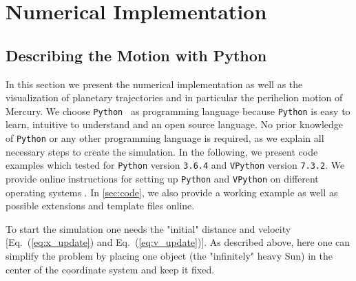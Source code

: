 \documentclass[12pt,ngerman,american]{iopart}
\newcommand{\python}[0]{\texttt{Python}}
\newcommand{\vpython}[0]{\texttt{VPython}}
\begin{document}



\section{Numerical Implementation}\label{sec:Numerical Implementation}

\subsection{Describing the Motion with Python}

In this section we present the numerical implementation as well as the visualization of planetary trajectories and in
particular the perihelion motion of Mercury.
We choose \python{}~\cite{Python} as programming language because \python{} is easy to learn, intuitive to understand and an open source language.
No prior knowledge of \python{} or any other programming language is required, as we explain all necessary steps to create the simulation.
In the following, we present code examples which tested for \python{} version \texttt{3.6.4} and \vpython{} version \texttt{7.3.2}.
We provide online instructions for setting up \python{} and \vpython{} on different operating systems \cite{scripts}.
In \ref{sec:code}, we also provide a working example as well as possible extensions and template files online.

To start the simulation one needs the "initial" distance and velocity [Eq.~(\ref{eq:x_update}) and Eq.~(\ref{eq:v_update})].
As described above, here one can simplify the problem by placing one object (the "infinitely" heavy Sun) in the center of the coordinate system and keep it fixed.
\end{document}
